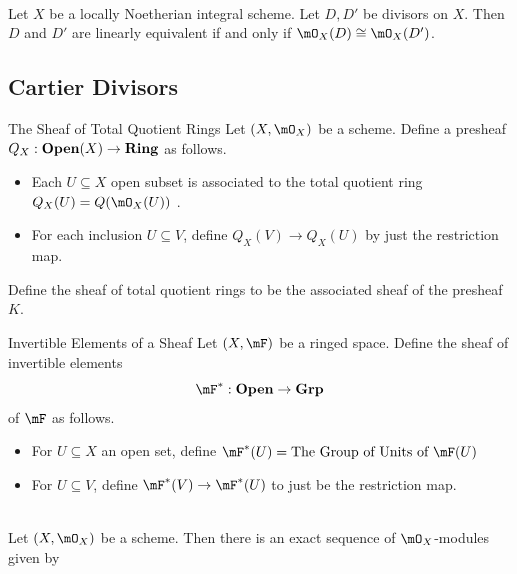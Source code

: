 \documentclass[a4paper]{article}
\begin{document}
\begin{lmm}{}{}\\
Let $X$ be a locally Noetherian integral scheme. Let $D,D'$ be divisors on $X$. Then $D$ and $D'$ are linearly equivalent if and only if $\mO_X(D)\cong\mO_X(D')$. 
\end{lmm}

\subsection{Cartier Divisors}
\begin{defn}{The Sheaf of Total Quotient Rings}{} Let $(X,\mO_X)$ be a scheme. Define a presheaf $Q_X:\bold{Open}(X)\to\bold{Ring}$ as follows. 
\begin{itemize}
\item Each $U\subseteq X$ open subset is associated to the total quotient ring $Q_X(U)=Q(\mO_X(U))$ . 
\item For each inclusion $U\subseteq V$, define $Q_X(V)\to Q_X(U)$ by just the restriction map. 
\end{itemize}
Define the sheaf of total quotient rings to be the associated sheaf of the presheaf $K$. 
\end{defn}

\begin{defn}{Invertible Elements of a Sheaf}{} Let $(X,\mF)$ be a ringed space. Define the sheaf of invertible elements $$\mF^\ast:\bold{Open}\to\bold{Grp}$$ of $\mF$ as follows. 
\begin{itemize}
\item For $U\subseteq X$ an open set, define $\mF^\ast(U)=\text{The Group of Units of }\mF(U)$
\item For $U\subseteq V$, define $\mF^\ast(V)\to\mF^\ast(U)$ to just be the restriction map. 
\end{itemize}
\end{defn}

\begin{lmm}{}{}\\
Let $(X,\mO_X)$ be a scheme. Then there is an exact sequence of $\mO_X$-modules given by \\
 \\
\end{lmm}
\end{document}
